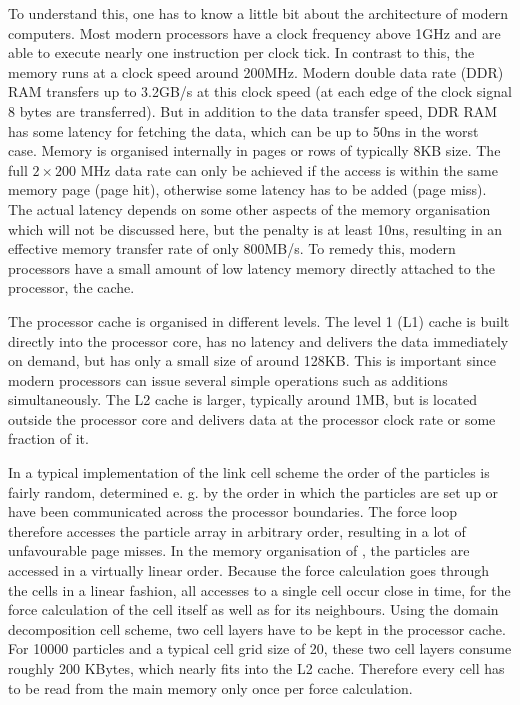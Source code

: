 To understand this, one has to know a little bit about the
architecture of modern computers. Most modern processors have a clock
frequency above 1GHz and are able to execute nearly one instruction
per clock tick. In contrast to this, the memory runs at a clock speed
around 200MHz. Modern double data rate (DDR) RAM transfers up to
3.2GB/s at this clock speed (at each edge of the clock signal 8 bytes
are transferred). But in addition to the data transfer speed, DDR RAM
has some latency for fetching the data, which can be up to 50ns in the
worst case. Memory is organised internally in pages or rows of
typically 8KB size. The full $2\times 200$ MHz data rate can only be
achieved if the access is within the same memory page (page hit),
otherwise some latency has to be added (page miss). The actual latency
depends on some other aspects of the memory organisation which will
not be discussed here, but the penalty is at least 10ns, resulting in
an effective memory transfer rate of only 800MB/s. To remedy this,
modern processors have a small amount of low latency memory directly
attached to the processor, the cache.

The processor cache is organised in different levels. The level 1 (L1)
cache is built directly into the processor core, has no latency and
delivers the data immediately on demand, but has only a small size of
around 128KB. This is important since modern processors can issue
several simple operations such as additions simultaneously. The L2
cache is larger, typically around 1MB, but is located outside the
processor core and delivers data at the processor clock rate or some
fraction of it.

In a typical implementation of the link cell scheme the order of the
particles is fairly random, determined e. g. by the order in which the
particles are set up or have been communicated across the processor
boundaries. The force loop therefore accesses the particle array in
arbitrary order, resulting in a lot of unfavourable page misses. In
the memory organisation of \es{}, the particles are accessed in a
virtually linear order. Because the force calculation goes through the
cells in a linear fashion, all accesses to a single cell occur close
in time, for the force calculation of the cell itself as well as for
its neighbours. Using the domain decomposition cell scheme, two cell
layers have to be kept in the processor cache. For 10000 particles and
a typical cell grid size of 20, these two cell layers consume roughly
200 KBytes, which nearly fits into the L2 cache. Therefore every cell
has to be read from the main memory only once per force calculation.



